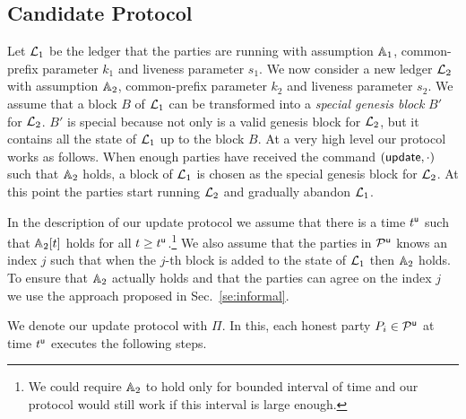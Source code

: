 \subsection{Candidate Protocol}

Let $\mathcal{L}_1$ be the ledger that the parties are running with assumption $\mathbb{A}_1$, common-prefix parameter $k_1$ 
and  liveness parameter $s_1$. 
We now consider a new ledger $\mathcal{L}_2$ with assumption $\mathbb{A}_2$, common-prefix parameter $k_2$ and  liveness parameter $s_2$.
We assume that a block $B$ of $\mathcal{L}_1$ can be transformed into a \emph{special genesis block} $B'$ for $\mathcal{L}_2$. $B'$ is special because not only
is a valid genesis block for $\mathcal{L}_2$, but it contains all the state of $\mathcal{L}_1$ up to the block $B$.  
At a very high level our protocol works as follows. When enough parties have received the command $(\mathsf{update},\cdot)$ such that $\mathbb{A}_2$ holds,
a block of $\mathcal{L}_1$ is chosen as the special genesis block for $\mathcal{L}_2$. At this point the parties start running $\mathcal{L}_2$ and gradually abandon 
$\mathcal{L}_1$.

In the description of our update protocol we assume that there is a time $t^{\mathsf{u}}$ such that $\mathbb{A}_2[t]$ holds for all $t\geq t^{\mathsf{u}}$.\footnote{We could require $\mathbb{A}_2$ to
hold only for bounded interval of time and our protocol would still work if this interval is large enough.}
We also assume that the parties in $\mathcal{P}^\mathsf{u}$ knows an index $j$ such that when the $j$-th block is added to the state of $\mathcal{L}_1$ then $\mathbb{A}_2$ holds. 
To ensure that $\mathbb{A}_2$ actually holds and that the parties can agree on the index $j$ we use the approach proposed in Sec.~\ref{se:informal}. 

We denote our update protocol with $\Pi$. In this, each honest party $P_i\in\mathcal{P}^\mathsf{u}$ at time $t^{\mathsf{u}}$ executes the following steps.

